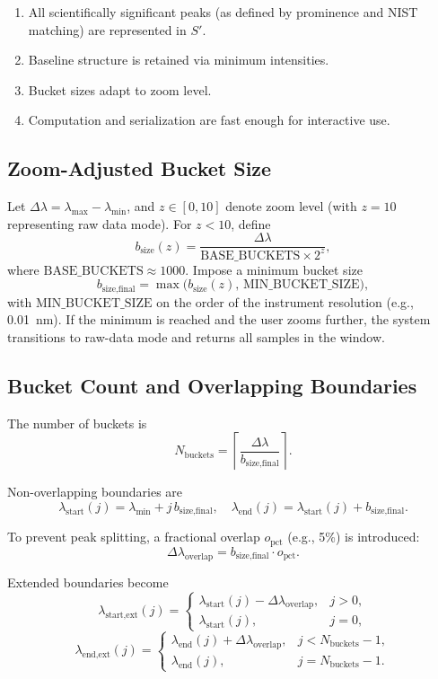 \documentclass[12pt,a4paper]{article}
\begin{document}
\begin{enumerate}[nosep]
  \item All scientifically significant peaks (as defined by prominence and NIST matching) are represented in \(S'\).
  \item Baseline structure is retained via minimum intensities.
  \item Bucket sizes adapt to zoom level.
  \item Computation and serialization are fast enough for interactive use.
\end{enumerate}

\subsection{Zoom-Adjusted Bucket Size}

Let \(\Delta\lambda = \lambda_{\max} - \lambda_{\min}\), and \(z \in [0,10]\) denote zoom level (with \(z=10\) representing raw data mode). For \(z < 10\), define
\[
b_{\text{size}}(z) = \frac{\Delta\lambda}{\text{BASE\_BUCKETS}\times 2^z},
\]
where \(\text{BASE\_BUCKETS}\approx 1000\). Impose a minimum bucket size
\[
b_{\text{size,final}} = \max\bigl(b_{\text{size}}(z),\, \text{MIN\_BUCKET\_SIZE}\bigr),
\]
with \(\text{MIN\_BUCKET\_SIZE}\) on the order of the instrument resolution (e.g., \SI{0.01}{nm}). If the minimum is reached and the user zooms further, the system transitions to raw-data mode and returns all samples in the window.

\subsection{Bucket Count and Overlapping Boundaries}

The number of buckets is
\[
N_{\text{buckets}} = \left\lceil \frac{\Delta\lambda}{b_{\text{size,final}}} \right\rceil.
\]

Non-overlapping boundaries are
\[
\lambda_{\text{start}}(j) = \lambda_{\min} + j\,b_{\text{size,final}}, \quad
\lambda_{\text{end}}(j) = \lambda_{\text{start}}(j) + b_{\text{size,final}}.
\]

To prevent peak splitting, a fractional overlap \(o_{\text{pct}}\) (e.g., 5\%) is introduced:
\[
\Delta\lambda_{\text{overlap}} = b_{\text{size,final}} \cdot o_{\text{pct}}.
\]

Extended boundaries become
\[
\lambda_{\text{start,ext}}(j) =
\begin{cases}
\lambda_{\text{start}}(j) - \Delta\lambda_{\text{overlap}}, & j>0,\\
\lambda_{\text{start}}(j), & j=0,
\end{cases}
\]
\[
\lambda_{\text{end,ext}}(j) =
\begin{cases}
\lambda_{\text{end}}(j) + \Delta\lambda_{\text{overlap}}, & j < N_{\text{buckets}}-1,\\
\lambda_{\text{end}}(j), & j = N_{\text{buckets}}-1.
\end{cases}
\]
\end{document}
